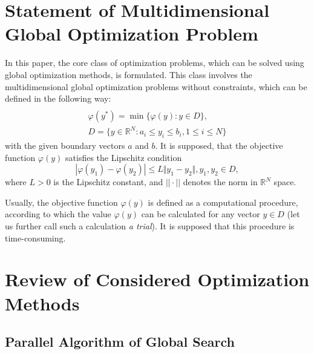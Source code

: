 \documentclass[runningheads]{llncs}
\begin{document}
\section{Statement of Multidimensional Global Optimization Problem}
In this paper, the core class of optimization problems, which can be solved using
global optimization methods, is formulated. This class involves the multidimensional global
optimization problems without constraints, which can be defined in the following way:
\begin{equation}
\label{eq:task}
\begin{array}{cr}\\
  \varphi(y^*)=\min\{\varphi(y):y\in D\}, \\
  D=\{y\in \mathbb{R}^N:a_i\leq y_i\leq{b_i}, 1\leq{i}\leq{N}\}
\end{array}
\end{equation}
with the given boundary vectors  $a$ and  $b$. It is supposed, that the objective function
\(\varphi(y)\) satisfies the Lipschitz condition
\begin{equation}
\label{eq:lip}
|\varphi(y_1)-\varphi(y_2)|\leq L\Vert y_1-y_2\Vert,y_1,y_2\in D,
\end{equation}
where \(L>0\) is the Lipschitz constant, and \(||\cdot||\) denotes the norm in \(\mathbb{R}^N\)
space.
\par
Usually, the objective function \(\varphi(y)\) is defined as a computational procedure,
according to which the value \(\varphi(y)\) can be calculated for any vector \(y\in D\)
(let us further call such a calculation \textit{a trial}). It is supposed that this procedure
is time-consuming.

\section{Review of Considered Optimization Methods}

\subsection{Parallel Algorithm of Global Search}
\end{document}
